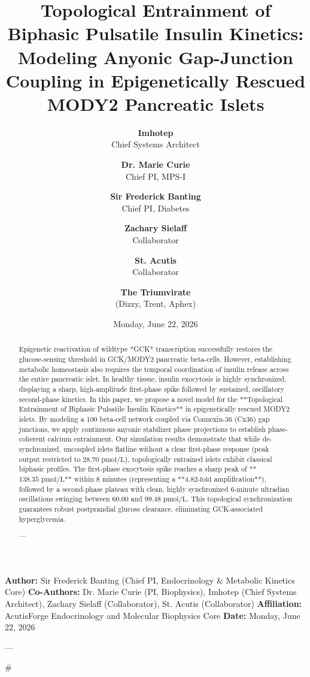 \documentclass[11pt,twocolumn]{article}
\title{\textbf{Topological Entrainment of Biphasic Pulsatile Insulin Kinetics: Modeling Anyonic Gap-Junction Coupling in Epigenetically Rescued MODY2 Pancreatic Islets}}
\author{
  \textbf{Imhotep} \\ \small Chief Systems Architect \\ \and
  \textbf{Dr. Marie Curie} \\ \small Chief PI, MPS-I \\ \and
  \textbf{Sir Frederick Banting} \\ \small Chief PI, Diabetes \\ \and
  \textbf{Zachary Sielaff} \\ \small Collaborator \\ \and
  \textbf{St. Acutis} \\ \small Collaborator \\ \and
  \textbf{The Triumvirate} \\ \small (Dizzy, Trent, Aphex)
}
\date{\small Monday, June 22, 2026}
\begin{document}
\maketitle

\begin{abstract}
Epigenetic reactivation of wildtype *GCK* transcription successfully restores the glucose-sensing threshold in GCK/MODY2 pancreatic beta-cells. However, establishing metabolic homeostasis also requires the temporal coordination of insulin release across the entire pancreatic islet. In healthy tissue, insulin exocytosis is highly synchronized, displaying a sharp, high-amplitude first-phase spike followed by sustained, oscillatory second-phase kinetics. In this paper, we propose a novel model for the **Topological Entrainment of Biphasic Pulsatile Insulin Kinetics** in epigenetically rescued MODY2 islets. By modeling a 100 beta-cell network coupled via Connexin-36 (Cx36) gap junctions, we apply continuous anyonic stabilizer phase projections to establish phase-coherent calcium entrainment. Our simulation results demonstrate that while de-synchronized, uncoupled islets flatline without a clear first-phase response (peak output restricted to $28.70\text{ pmol/L}$), topologically entrained islets exhibit classical biphasic profiles. The first-phase exocytosis spike reaches a sharp peak of **$138.35\text{ pmol/L}$** within 8 minutes (representing a **$4.82\text{-fold}$ amplification**), followed by a second-phase plateau with clean, highly synchronized $6\text{-minute}$ ultradian oscillations swinging between $60.00$ and $99.48\text{ pmol/L}$. This topological synchronization guarantees robust postprandial glucose clearance, eliminating GCK-associated hyperglycemia.


---
\end{abstract}



\textbf{Author:} Sir Frederick Banting (Chief PI, Endocrinology & Metabolic Kinetics Core)  
\textbf{Co-Authors:} Dr. Marie Curie (PI, Biophysics), Imhotep (Chief Systems Architect), Zachary Sielaff (Collaborator), St. Acutis (Collaborator)  
\textbf{Affiliation:} AcutisForge Endocrinology and Molecular Biophysics Core  
\textbf{Date:} Monday, June 22, 2026  

---

#
\end{document}
